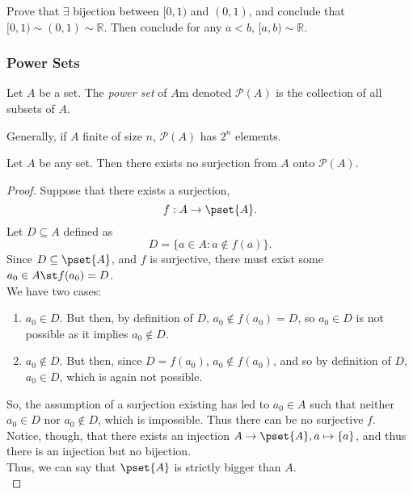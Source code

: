 \documentclass[12pt]{article}
\begin{document}
\begin{example}
  Prove that $\exists$ bijection between $[0,1)$ and $(0,1)$, and conclude that $[0,1) \sim (0,1) \sim \mathbb{R}$. Then conclude for any $a < b$, $[a,b) \sim \mathbb{R}$.

\end{example}

\subsubsection{Power Sets}
\begin{definition}
  Let $A$ be a set. The \emph{power set} of $A$m denoted $\mathcal{P}(A)$ is the collection of all subsets of $A$.

  Generally, if $A$ finite of size $n$, $\mathcal{P}(A)$ has $2^n$ elements.
\end{definition}

\begin{theorem}
  Let $A$ be any set. Then there exists no surjection from $A$ onto $\mathcal{P}(A)$. \footnotemark
\end{theorem}


\begin{proof}
  Suppose that there exists a surjection, \[f: A \to \pset{A}.\] Let $D \subseteq A$ defined as \[D = \{a \in A: a \notin f(a)\}.\] Since $D \subseteq \pset{A}$, and $f$ is surjective, there must exist some $a_0 \in A \st f(a_0) = D$.\\
  We have two cases:
  \begin{enumerate}
    \item $a_0 \in D.$ But then, by definition of $D$, $a_0 \notin f(a_0) = D$, so $a_0 \in D$ is not possible as it implies $a_0 \notin D$.
    \item $a_0 \notin D.$ But then, since $D = f(a_0)$, $a_0 \notin f(a_0)$, and so by definition of $D$, $a_0 \in D$, which is again not possible.
  \end{enumerate}
  So, the assumption of a surjection existing has led to $a_0 \in A$ such that neither $a_0 \in D$ nor $a_0 \notin D$, which is impossible. Thus there can be no surjective $f$.\\
  Notice, though, that there exists an injection $A \to \pset{A}, a \mapsto \{a\}$, and thus there is an injection but no bijection.\\
  Thus, we can say that $\pset{A}$ is strictly bigger than $A$.\\
\end{proof}
\end{document}
